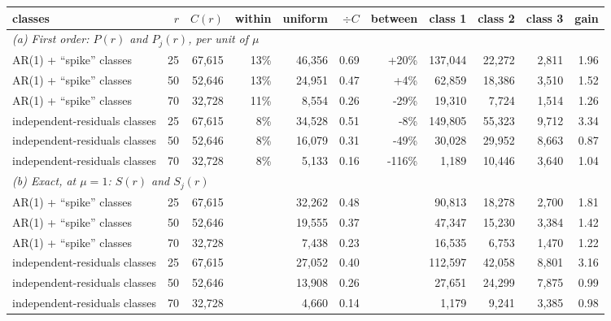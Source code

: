\begin{tabular}{lrrrrrrrrrr}
\toprule
classes & $r$ & $C(r)$ & within & uniform & $\div C$ & between & class 1 & class 2 & class 3 & gain \\
\midrule
\multicolumn{11}{l}{\textit{(a) First order: $P(r)$ and $P_j(r)$, per unit of $\mu$}} \\
AR(1) + ``spike'' classes & 25 & 67,615 & 13\% & 46,356 & 0.69 & +20\% & 137,044 & 22,272 & 2,811 & 1.96 \\
AR(1) + ``spike'' classes & 50 & 52,646 & 13\% & 24,951 & 0.47 & +4\% & 62,859 & 18,386 & 3,510 & 1.52 \\
AR(1) + ``spike'' classes & 70 & 32,728 & 11\% & 8,554 & 0.26 & -29\% & 19,310 & 7,724 & 1,514 & 1.26 \\
independent-residuals classes & 25 & 67,615 & 8\% & 34,528 & 0.51 & -8\% & 149,805 & 55,323 & 9,712 & 3.34 \\
independent-residuals classes & 50 & 52,646 & 8\% & 16,079 & 0.31 & -49\% & 30,028 & 29,952 & 8,663 & 0.87 \\
independent-residuals classes & 70 & 32,728 & 8\% & 5,133 & 0.16 & -116\% & 1,189 & 10,446 & 3,640 & 1.04 \\
\midrule\multicolumn{11}{l}{\textit{(b) Exact, at $\mu=1$: $S(r)$ and $S_j(r)$}} \\
AR(1) + ``spike'' classes & 25 & 67,615 &  & 32,262 & 0.48 &  & 90,813 & 18,278 & 2,700 & 1.81 \\
AR(1) + ``spike'' classes & 50 & 52,646 &  & 19,555 & 0.37 &  & 47,347 & 15,230 & 3,384 & 1.42 \\
AR(1) + ``spike'' classes & 70 & 32,728 &  & 7,438 & 0.23 &  & 16,535 & 6,753 & 1,470 & 1.22 \\
independent-residuals classes & 25 & 67,615 &  & 27,052 & 0.40 &  & 112,597 & 42,058 & 8,801 & 3.16 \\
independent-residuals classes & 50 & 52,646 &  & 13,908 & 0.26 &  & 27,651 & 24,299 & 7,875 & 0.99 \\
independent-residuals classes & 70 & 32,728 &  & 4,660 & 0.14 &  & 1,179 & 9,241 & 3,385 & 0.98 \\
\bottomrule
\end{tabular}
